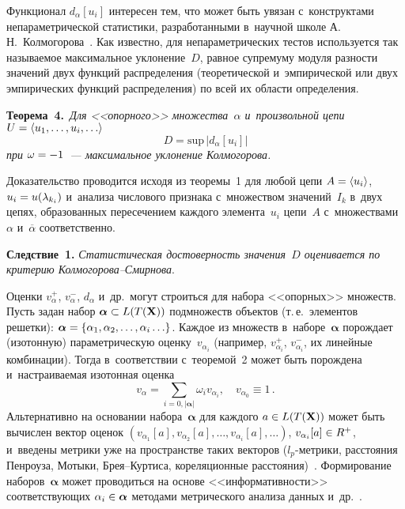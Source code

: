 \begin{multicols}{2}
     \medskip

Функционал $d_\alpha[u_i]$ интересен тем, что может быть увязан 
с~конструктами не\-па\-ра\-мет\-ри\-че\-ской ста\-ти\-сти\-ки, разработанными в~научной 
школе А.\,Н.~Колмогорова~\cite{7-tor}. Как известно, для 
не\-па\-ра\-мет\-ри\-че\-ских тес\-тов используется так на\-зы\-ва\-емое максимальное 
уклонение~$D$, рав\-ное супремуму модуля раз\-ности значений двух функций 
распределения (тео\-ре\-ти\-че\-ской и~эмпирической или двух эмпирических 
функций распределения) по всей их об\-ласти опре\-де\-ле\-ния.

     \medskip
     
     \noindent
\textbf{Теорема~4.}\ \textit{Для <<опор\-но\-го>> множества~$\alpha$ 
и~произвольной цепи $U\hm= \langle u_1, \ldots , u_i, \ldots\rangle$ 
$$
D=\mathrm{sup}\,\vert d_\alpha[u_i]\vert
$$ 
при $\omega\hm= -1$~--- максимальное уклонение Кол\-мо\-го\-рова.}

     \medskip

     \noindent
     Доказательство проводится исходя из тео\-ре\-мы~1 для любой цепи 
$A\hm= \langle u_i\rangle$, $u_i\hm= u(\lambda_{k_i})$ и~анализа чис\-ло\-во\-го 
при\-зна\-ка с~множеством значений~$I_k$ в~двух цепях, образованных 
пересечением каж\-до\-го элемента~$u_i$ цепи~$A$ с~множествами~$\alpha$ 
и~$\overline{\alpha}$ со\-от\-вет\-ст\-венно.

     \medskip
     
     \noindent
\textbf{Следствие~1.} \textit{Статистическая до\-сто\-вер\-ность значения~$D$ 
оценивается по критерию Кол\-мо\-го\-ро\-ва--Смир\-нова}.

     \medskip

    Оценки $v_\alpha^+$, $v_\alpha^-$, $d_\alpha$ и~др.\ могут строиться 
для набора <<опор\-ных>> множеств. Пусть задан 
набор $\bm{\alpha}\hm\subset L(T(\mathbf{X}))$ подмножеств объектов 
(т.\,е.\ элементов решетки): $\bm{\alpha}\hm= \{\alpha_1, \alpha_2, \ldots , 
\alpha_i\ldots\}$. Каж\-дое из множеств в~наборе~$\bm{\alpha}$ по\-рож\-да\-ет 
(изотонную) па\-ра\-мет\-ри\-че\-скую оцен\-ку~$v_{\alpha_i}$ (например, 
$v^+_{\alpha_i}$, $v^-_{\alpha_i}$, их линейные комбинации). Тогда 
в~соответствии с~тео\-ре\-мой~2 может быть по\-рож\-де\-на и~на\-стра\-и\-ва\-емая 
изотонная оцен\-ка 
$$
v_\alpha= \sum\limits_{i=0,\vert \bm{\alpha}\vert} \!\omega_i 
v_{\alpha_i},\quad v_{\alpha_0} \equiv 1\,.
$$
 Альтернативно на основании 
набора~$\bm{\alpha}$ для каж\-до\-го $a\hm\in L(T(\mathbf{X}))$ может быть 
вы\-чис\-лен вектор оценок $(v_{\alpha_1}[a], v_{\alpha_2}[a], \ldots , 
v_{\alpha_i}[a], \ldots)$, $v_{\alpha_i}[a]\hm\in R^+$, и~введены мет\-ри\-ки уже на 
про\-стран\-ст\-ве таких векторов ($l_p$-мет\-ри\-ки, рас\-сто\-яния Пен\-роу\-за, 
Мотыки, Брея--Кур\-ти\-са, кореляционные  
рас\-сто\-яния)~\cite{6-tor}. Формирование наборов~$\bm{\alpha}$ может 
проводиться на основе <<ин\-фор\-ма\-тив\-ности>> со\-от\-вет\-ст\-ву\-ющих 
$\alpha_i\hm\in \bm{\alpha}$ методами мет\-ри\-че\-ско\-го анализа данных 
и~др.~\cite{4-tor}. 


\end{multicols}
